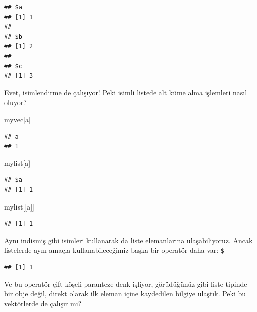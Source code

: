 \documentclass[
]{book}
\newenvironment{Shaded}{\begin{snugshade}}{\end{snugshade}}
\newcommand{\NormalTok}[1]{#1}
\newcommand{\SpecialCharTok}[1]{\textcolor[rgb]{0.00,0.00,0.00}{#1}}
\newcommand{\StringTok}[1]{\textcolor[rgb]{0.31,0.60,0.02}{#1}}
\begin{document}
\begin{verbatim}
## $a
## [1] 1
## 
## $b
## [1] 2
## 
## $c
## [1] 3
\end{verbatim}

Evet, isimlendirme de çalışıyor! Peki isimli listede alt küme alma işlemleri nasıl oluyor?

\begin{Shaded}
\begin{Highlighting}[]
\NormalTok{myvec[}\StringTok{\textquotesingle{}a\textquotesingle{}}\NormalTok{]}
\end{Highlighting}
\end{Shaded}

\begin{verbatim}
## a 
## 1
\end{verbatim}

\begin{Shaded}
\begin{Highlighting}[]
\NormalTok{mylist[}\StringTok{\textquotesingle{}a\textquotesingle{}}\NormalTok{]}
\end{Highlighting}
\end{Shaded}

\begin{verbatim}
## $a
## [1] 1
\end{verbatim}

\begin{Shaded}
\begin{Highlighting}[]
\NormalTok{mylist[[}\StringTok{\textquotesingle{}a\textquotesingle{}}\NormalTok{]]}
\end{Highlighting}
\end{Shaded}

\begin{verbatim}
## [1] 1
\end{verbatim}

Aynı indismiş gibi isimleri kullanarak da liste elemanlarına ulaşabiliyoruz. Ancak listelerde aynı amaçla kullanabileceğimiz başka bir operatör daha var: \texttt{\$}

\begin{Shaded}
\end{Shaded}

\begin{verbatim}
## [1] 1
\end{verbatim}

Ve bu operatör çift köşeli paranteze denk işliyor, görüdüğünüz gibi liste tipinde bir obje değil, direkt olarak ilk eleman içine kaydedilen bilgiye ulaştık. Peki bu vektörlerde de çalışır mı?
\end{document}
